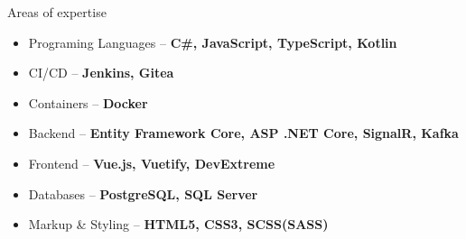 \documentclass{resume}
\begin{document}
\begin{rSection}{Areas of expertise}
    \begin{minipage}[t]{0.33\textwidth}
        \begin{flushleft}
            \begin{itemize}[leftmargin=0.5cm]
                \setlength\itemsep{0.4em}
                \item Programing Languages – \textbf{C\#, JavaScript, TypeScript, Kotlin}
                \item CI/CD – \textbf{Jenkins, Gitea}
                \item Containers – \textbf{Docker}
            \end{itemize}
        \end{flushleft}
    \end{minipage}
    \begin{minipage}[t]{0.33\textwidth}
        \begin{flushleft}
            \begin{itemize}[leftmargin=0.5cm]
                \setlength\itemsep{0.4em}
                \item Backend – \textbf{Entity Framework Core, ASP .NET Core, SignalR, Kafka}
                \item Frontend – \textbf{Vue.js, Vuetify, DevExtreme}
            \end{itemize}
        \end{flushleft}
    \end{minipage}
    \begin{minipage}[t]{0.33\textwidth}
        \begin{flushleft}
            \begin{itemize}[leftmargin=0.5cm]
                \setlength\itemsep{0.4em}
                \item Databases – \textbf{PostgreSQL, SQL Server}
                \item Markup \& Styling – \textbf{HTML5, CSS3, SCSS(SASS)}
            \end{itemize}
        \end{flushleft}
    \end{minipage}
\end{rSection}
\end{document}
